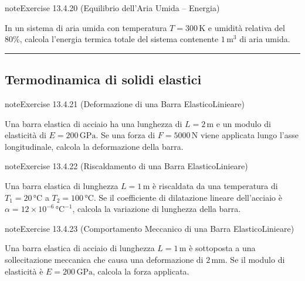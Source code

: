 \documentclass[letterpaper,10pt,italian]{jupyterBook}
\begin{document}
\begin{sphinxadmonition}{note}{Exercise 13.4.20 (Equilibrio dell’Aria Umida – Energia)}



\sphinxAtStartPar
In un sistema di aria umida con temperatura \(T = 300 \, \text{K}\) e umidità relativa del \(80\%\), calcola l’energia termica totale del sistema contenente \(1 \, \text{m}^3\) di aria umida.
\end{sphinxadmonition}


\bigskip\hrule\bigskip



\subsection{Termodinamica di solidi elastici}
\label{\detokenize{ch/thermodynamics/matter-problems:termodinamica-di-solidi-elastici}} \label{exercise:ch/thermodynamics/matter-problems-exercise-20}

\begin{sphinxadmonition}{note}{Exercise 13.4.21 (Deformazione di una Barra Elastico\sphinxhyphen{}Linieare)}



\sphinxAtStartPar
Una barra elastica di acciaio ha una lunghezza di \(L = 2 \, \text{m}\) e un modulo di elasticità di \(E = 200 \, \text{GPa}\). Se una forza di \(F = 5000 \, \text{N}\) viene applicata lungo l’asse longitudinale, calcola la deformazione della barra.
\end{sphinxadmonition}
 \label{exercise:ch/thermodynamics/matter-problems-exercise-21}

\begin{sphinxadmonition}{note}{Exercise 13.4.22 (Riscaldamento di una Barra Elastico\sphinxhyphen{}Linieare)}



\sphinxAtStartPar
Una barra elastica di lunghezza \(L = 1 \, \text{m}\) è riscaldata da una temperatura di \(T_1 = 20 \, \text{°C}\) a \(T_2 = 100 \, \text{°C}\). Se il coefficiente di dilatazione lineare dell’acciaio è \( \alpha = 12 \times 10^{-6} \, \text{°C}^{-1}\), calcola la variazione di lunghezza della barra.
\end{sphinxadmonition}
 \label{exercise:ch/thermodynamics/matter-problems-exercise-22}

\begin{sphinxadmonition}{note}{Exercise 13.4.23 (Comportamento Meccanico di una Barra Elastico\sphinxhyphen{}Linieare)}



\sphinxAtStartPar
Una barra elastica di acciaio di lunghezza \(L = 1 \, \text{m}\) è sottoposta a una sollecitazione meccanica che causa una deformazione di \(2 \, \text{mm}\). Se il modulo di elasticità è \(E = 200 \, \text{GPa}\), calcola la forza applicata.
\end{sphinxadmonition}
\end{document}
